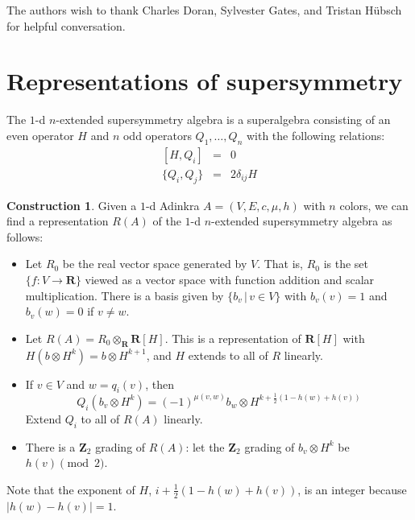 \documentclass[12pt,twoside,singlespace]{article}
\numberwithin{equation}{section}
\theoremstyle{definition}
\newtheorem{construction}[equation]{Construction}
\newcommand{\ZZ}{\mathbf{Z}}
\newcommand{\RR}{\mathbf{R}}
\begin{document}
The authors wish to thank Charles Doran, Sylvester Gates, and Tristan H\"ubsch for helpful conversation.

\appendix

\section{Representations of supersymmetry}
The $1$-d $n$-extended supersymmetry algebra is a superalgebra consisting of an even operator $H$ and $n$ odd operators $Q_1, \ldots, Q_n$ with the following relations:
\begin{eqnarray}
\label{eqn:susy1d1}
[H,Q_i]&=&0\\
\label{eqn:susy1d2}
\{Q_i,Q_j\}&=&2\delta_{ij}H
\end{eqnarray}

\begin{construction}
\label{cons:susy1d}
Given a $1$-d Adinkra $A=(V,E,c,\mu,h)$ with $n$ colors, we can find a representation $R(A)$ of the $1$-d $n$-extended supersymmetry algebra as follows:
\begin{itemize}
\item Let $R_0$ be the real vector space generated by $V$.  That is, $R_0$ is the set $\{f:V\to \RR\}$ viewed as a vector space with function addition and scalar multiplication.  There is a basis given by $\{b_v\,|\,v\in V\}$ with $b_v(v)=1$ and $b_v(w)=0$ if $v\not=w$.
\item Let $R(A)=R_0\otimes_\RR \RR[H]$.  This is a representation of $\RR[H]$ with $H(b\otimes H^k)=b\otimes H^{k+1}$, and $H$ extends to all of $R$ linearly.
\item If $v\in V$ and $w=q_i(v)$, then
\[Q_i(b_v\otimes H^k)=(-1)^{\mu(v,w)} b_w\otimes H^{k+\frac12(1-h(w)+h(v))}\]
Extend $Q_i$ to all of $R(A)$ linearly.
\item There is a $\ZZ_2$ grading of $R(A)$: let the $\ZZ_2$ grading of $b_v\otimes H^k$ be $h(v)\pmod{2}$.
\end{itemize}
\end{construction}
Note that the exponent of $H$, $i+\frac12(1-h(w)+h(v))$, is an integer because $|h(w)-h(v)|=1$.
\end{document}
